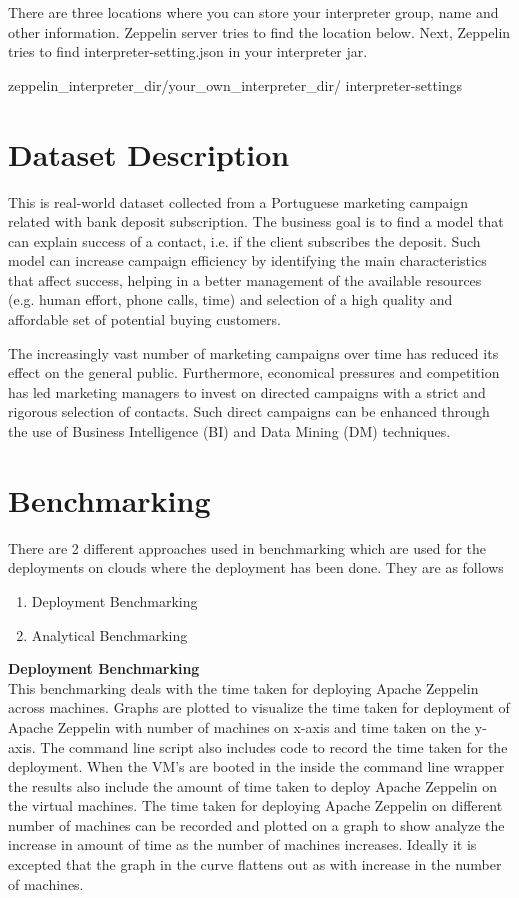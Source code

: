 \documentclass[9pt,twocolumn,twoside]{../../styles/osajnl}
\begin{document}
There are three locations where you can store your interpreter group, 
name and other information. Zeppelin server tries to find the 
location below. Next, Zeppelin tries to find interpreter-setting.json 
in your interpreter jar.

zeppelin\_interpreter\_dir/your\_own\_interpreter\_dir/
interpreter-settings

\section{Dataset Description}

This is real-world dataset\cite{www-datasetdes} collected from a 
Portuguese marketing campaign related with bank deposit subscription. 
The business goal is to find a model that can explain success of a 
contact, i.e. if the client subscribes the deposit. Such model can 
increase campaign efficiency by identifying the main characteristics 
that affect success, helping in a better management of the available 
resources (e.g. human effort, phone calls, time) and selection of a 
high quality and affordable set of potential buying customers.

The increasingly vast number of marketing campaigns over time has 
reduced its effect on the general public. Furthermore, economical 
pressures and competition has led marketing managers to invest on 
directed campaigns with a strict and rigorous selection of contacts. 
Such direct campaigns can be enhanced through the use of Business 
Intelligence (BI) and Data Mining (DM) techniques.

\section{Benchmarking}

There are 2 different approaches used in benchmarking which are used 
for the deployments on clouds where the deployment has been done. 
They are as follows

\begin{enumerate}
	\item Deployment Benchmarking
	\item Analytical Benchmarking
\end{enumerate}

{\bf \hspace{-3ex}Deployment Benchmarking}
\\
This benchmarking deals with the time taken for deploying Apache 
Zeppelin across machines. Graphs are plotted to visualize the time 
taken for deployment of Apache Zeppelin with number of machines on 
x-axis and time taken on the y-axis. The command line script also 
includes code to record the time taken for the deployment. When the 
VM's are booted in the inside the command line wrapper the results 
also include the amount of time taken to deploy Apache Zeppelin on 
the virtual machines. The time taken for deploying Apache Zeppelin on 
different number of machines can be recorded and plotted on a graph 
to show analyze the increase in amount of time as the number of 
machines increases. Ideally it is excepted that the graph in the 
curve flattens out as with increase in the number of machines.
\end{document}

